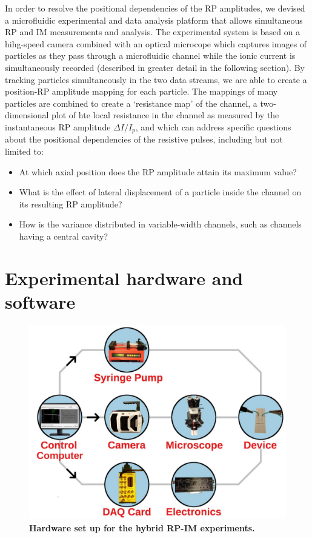 		In order to resolve the positional dependencies of the RP amplitudes, we devised a microfluidic experimental and data analysis platform that allows simultaneous RP and IM measurements and analysis. The experimental system is based on a hihg-speed camera combined with an optical microcope which captures images of particles as they pass through a microfluidic channel while the ionic current is simultaneously recorded (described in greater detail in the following section). By tracking particles simultaneously in the two data streams, we are able to create a position-RP amplitude mapping for each particle. The mappings of many particles are combined to create a `resistance map' of the channel, a two-dimensional plot of hte local resistance in the channel as measured by the instantaneous RP amplitude $\Delta I/I_{p}$, and which can address specific questions about the positional dependencies of the resistive pulses, including but not limited to:
		
		\begin{itemize}
			\item At which axial position does the RP amplitude attain its maximum value?
			\item What is the effect of lateral displacement of a particle inside the channel on its resulting RP amplitude?
			\item How is the variance distributed in variable-width channels, such as channels having a central cavity?
		\end{itemize}

		
		
	\section{Experimental hardware and software}
	      
		\begin{figure}
			\includegraphics[width=\textwidth]{hardware.jpg}
			\caption{\textbf{Hardware set up for the hybrid RP-IM experiments.}}
			\label{fig:hardware}
		\end{figure}

